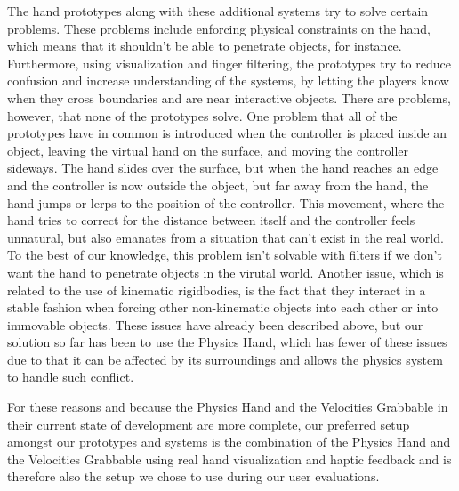 The hand prototypes along with these additional systems try to solve certain problems. These problems include enforcing physical constraints on the hand, which means that it shouldn't be able to penetrate objects, for instance. Furthermore, using visualization and finger filtering, the prototypes try to reduce confusion and increase understanding of the systems, by letting the players know when they cross boundaries and are near interactive objects. There are problems, however, that none of the prototypes solve. One problem that all of the prototypes have in common is introduced when the controller is placed inside an object, leaving the virtual hand on the surface, and moving the controller sideways. The hand slides over the surface, but when the hand reaches an edge and the controller is now outside the object, but far away from the hand, the hand jumps or lerps to the position of the controller. This movement, where the hand tries to correct for the distance between itself and the controller feels unnatural, but also emanates from a situation that can't exist in the real world. To the best of our knowledge, this problem isn't solvable with filters if we don't want the hand to penetrate objects in the virutal world. Another issue, which is related to the use of kinematic rigidbodies, is the fact that they interact in a stable fashion when forcing other non-kinematic objects into each other or into immovable objects. These issues have already been described above, but our solution so far has been to use the Physics Hand, which has fewer of these issues due to that it can be affected by its surroundings and allows the physics system to handle such conflict.

For these reasons and because the Physics Hand and the Velocities Grabbable in their current state of development are more complete, our preferred setup amongst our prototypes and systems is the combination of the Physics Hand and the Velocities Grabbable using real hand visualization and haptic feedback and is therefore also the setup we chose to use during our user evaluations.
